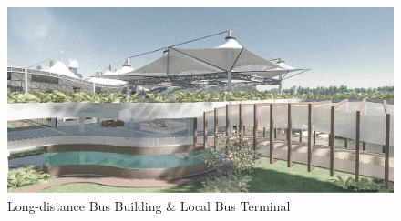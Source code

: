 ﻿%
\begin{figure}[H]
	\centering
	\includegraphics[width=\linewidth]{src/graphics/kalideres-integrated-bus-terminal--perspective-local-bus-bridge.jpg}
	\caption*{%
		Long-distance Bus Building \& Local Bus Terminal
	}
	\label{
		fig:kalideres-integrated-bus-terminal--perspective-local-bus-bridge
	}
\end{figure}
